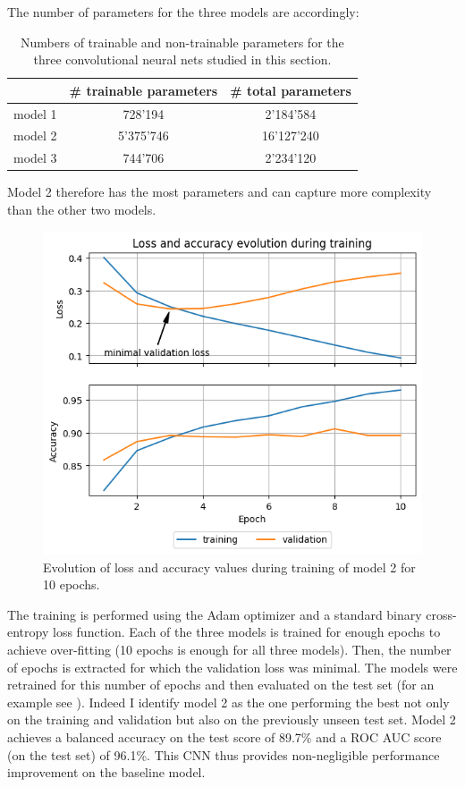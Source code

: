 \documentclass{article}
\begin{document}
\noindent The number of parameters for the three models are accordingly:
\begin{table}[h!]
\begin{center}
\caption{Numbers of trainable and non-trainable parameters for the three convolutional neural nets studied in this section.}
\label{tab:nparams}
\begin{tabular}{| l | c | c | }
\hline\hline
&\# trainable parameters& \# total parameters\\
\hline\hline
model 1&728'194&2'184'584\\
model 2&5'375'746&16'127'240\\
model 3&744'706&2'234'120\\
\hline\hline
\end{tabular}
\end{center}
\end{table}
\FloatBarrier
\noindent Model 2 therefore has the most parameters and can capture more complexity than the other two models. 
\begin{figure}[t!]
  \centering
  \includegraphics[width=\textwidth]{imgs/loss_curve_model2.png}
  \caption{Evolution of loss and accuracy values during training of model 2 for 10 epochs.}
  \label{fig:losscurve}
\end{figure}
\FloatBarrier
The training is performed using the Adam optimizer and a standard binary cross-entropy loss function. Each of the three models is trained for enough epochs to achieve over-fitting (10 epochs is enough for all three models). Then, the number of epochs is extracted for which the validation loss was minimal. The models were retrained for this number of epochs and then evaluated on the test set (for an example see ). Indeed I identify model 2 as the one performing the best not only on the training and validation but also on the previously unseen test set. Model 2 achieves a balanced accuracy on the test score of 89.7\% and a ROC AUC score (on the test set) of 96.1\%. This CNN thus provides non-negligible performance improvement on the baseline model.
\end{document}
